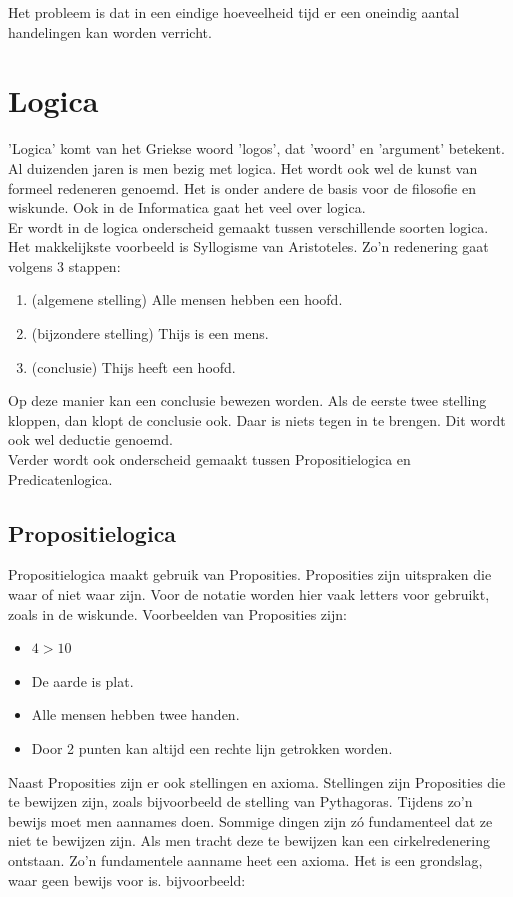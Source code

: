 \documentclass{article}
\begin{document}
\noindent Het probleem is dat in een eindige hoeveelheid tijd er een oneindig aantal handelingen kan worden verricht. \par
		
	\newpage
	
	
	\section{Logica}
	
	'Logica' komt van het Griekse woord 'logos', dat 'woord' en 'argument' betekent. Al duizenden jaren is men bezig met logica. Het wordt ook wel de kunst van formeel redeneren genoemd. Het is onder andere de basis voor de filosofie en wiskunde. Ook in de Informatica gaat het veel over logica. \\
	Er wordt in de logica onderscheid gemaakt tussen verschillende soorten logica. Het makkelijkste voorbeeld is Syllogisme van Aristoteles. Zo'n redenering gaat volgens 3 stappen:

	\begin{enumerate}
		\item (algemene stelling) Alle mensen hebben een hoofd.
		\item (bijzondere stelling) Thijs is een mens.
		\item (conclusie) Thijs heeft een hoofd.
	\end{enumerate}
	Op deze manier kan een conclusie bewezen worden. Als de eerste twee stelling kloppen, dan klopt de conclusie ook. Daar is niets tegen in te brengen. Dit wordt ook wel deductie genoemd. \\
	Verder wordt ook onderscheid gemaakt tussen Propositielogica en Predicatenlogica.
	
		\subsection{Propositielogica}
		
		Propositielogica maakt gebruik van Proposities. Proposities zijn uitspraken die waar of niet waar zijn. Voor de notatie worden hier vaak letters voor gebruikt, zoals in de wiskunde. Voorbeelden van Proposities zijn:

		\begin{itemize}
			\item \( 4 > 10 \)
			\item De aarde is plat.
			\item Alle mensen hebben twee handen.
			\item Door 2 punten kan altijd een rechte lijn getrokken worden.
		\end{itemize}
		Naast Proposities zijn er ook stellingen en axioma. Stellingen zijn Proposities die te bewijzen zijn, zoals bijvoorbeeld de stelling van Pythagoras. Tijdens zo'n bewijs moet men aannames doen. Sommige dingen zijn zó fundamenteel dat ze niet te bewijzen zijn. Als men tracht deze te bewijzen kan een cirkelredenering ontstaan. Zo'n fundamentele aanname heet een axioma. Het is een grondslag, waar geen bewijs voor is. bijvoorbeeld:
\end{document}
